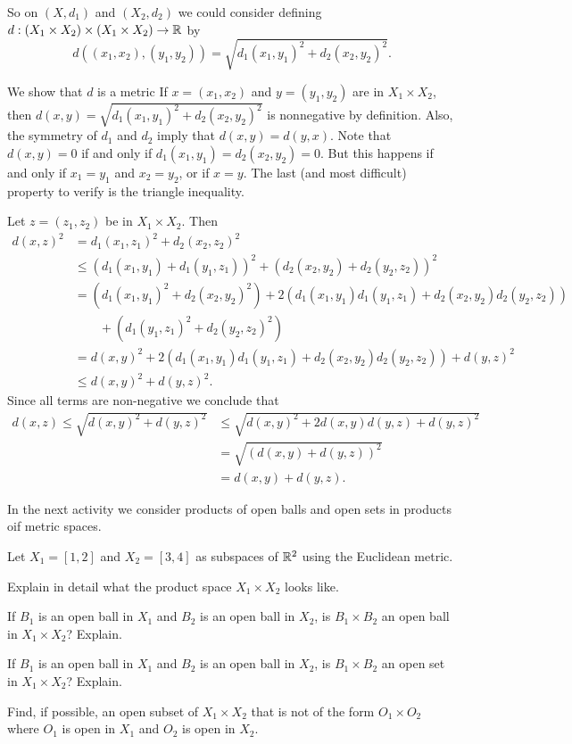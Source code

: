 So on $(X, d_1)$ and $(X_2 ,d_2)$ we could consider defining $d : (X_1 \times X_2) \times (X_1 \times X_2) \to \mathbb{R}$ by
\[d((x_1,x_2), (y_1,y_2)) = \sqrt{ d_1(x_1,y_1)^2 + d_2(x_2,y_2)^2}.\]

We show that $d$ is a metric If $x=(x_1,x_2)$ and $y=(y_1,y_2)$ are in $X_1 \times X_2$, then $d(x,y) = \sqrt{ d_1(x_1,y_1)^2 + d_2(x_2,y_2)^2}$ is nonnegative by definition. Also, the symmetry of $d_1$ and $d_2$ imply that $d(x,y) = d(y,x)$. Note that $d(x,y) = 0$ if and only if $d_1(x_1,y_1) = d_2(x_2,y_2) = 0$. But this happens if and only if $x_1=y_1$ and $x_2=y_2$, or if $x = y$. The last (and most difficult) property to verify is the triangle inequality. 

Let $z = (z_1, z_2)$ be in $X_1 \times X_2$. Then
\begin{align*}
d(x,z)^2 &=  d_1(x_1,z_1)^2 + d_2(x_2,z_2)^2 \\
	&\leq \left(d_1(x_1,y_1) + d_1(y_1,z_1)\right)^2 + \left(d_2(x_2,y_2) + d_2(y_2,z_2)\right)^2 \\
	&= \left(d_1(x_1,y_1)^2 + d_2(x_2,y_2)^2\right) + 2\left(d_1(x_1,y_1)d_1(y_1,z_1) + d_2(x_2,y_2)d_2(y_2,z_2)\right) \\
	&\qquad + \left(d_1(y_1,z_1)^2 + d_2(y_2,z_2)^2\right)  \\
	&= d(x,y)^2 + 2\left(d_1(x_1,y_1)d_1(y_1,z_1) + d_2(x_2,y_2)d_2(y_2,z_2)\right) + d(y,z)^2 \\
	&\leq d(x,y)^2 + d(y,z)^2.
\end{align*}
Since all terms are non-negative we conclude that 
\begin{align*}
d(x,z) \leq \sqrt{d(x,y)^2 + d(y,z)^2} &\leq \sqrt{d(x,y)^2 + 2 d(x,y)d(y,z) + d(y,z)^2} \\
	&= \sqrt{\left(d(x,y)+d(y,z)\right)^2} \\
	&= d(x,y) + d(y,z).
\end{align*}

In the next activity we consider products of open balls and open sets in products oif metric spaces.

\begin{activity} \label{act:ms_product_open} Let $X_1 = [1,2]$ and $X_2 = [3,4]$ as subspaces of $\mathbb{R}^2$ using the Euclidean metric. 
\ba
\item Explain in detail what the product space $X_1 \times X_2$ looks like. 

\item If $B_1$ is an open ball in $X_1$ and $B_2$ is an open ball in $X_2$, is $B_1 \times B_2$ an open ball in $X_1 \times X_2$? Explain.

\item If $B_1$ is an open ball in $X_1$ and $B_2$ is an open ball in $X_2$, is $B_1 \times B_2$ an open set in $X_1 \times X_2$? Explain.

\item Find, if possible, an open subset of $X_1 \times X_2$ that is not of the form $O_1 \times O_2$ where $O_1$ is open in $X_1$ and $O_2$ is open in $X_2$.

\ea

\end{activity}

